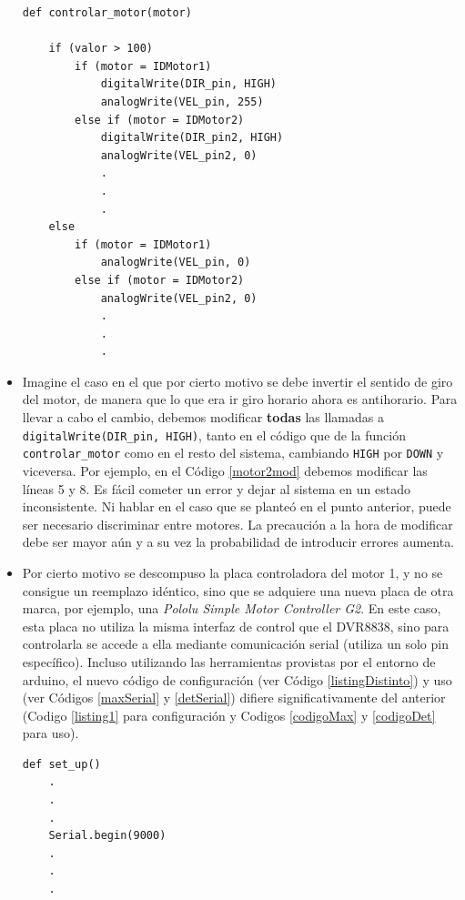 \begin{itemize}
\begin{lstlisting}[caption=Modificación de la función controlar\_motor para cambiar su comportamiento al utilizar el motor 2.,label={motor2mod}]
def controlar_motor(motor)

	if (valor > 100)
		if (motor = IDMotor1)
    		digitalWrite(DIR_pin, HIGH)
	    	analogWrite(VEL_pin, 255)
		else if (motor = IDMotor2)
	    	digitalWrite(DIR_pin2, HIGH)
	    	analogWrite(VEL_pin2, 0)
	    	.
	    	.
	    	.
	else
		if (motor = IDMotor1)
	    	analogWrite(VEL_pin, 0)
		else if (motor = IDMotor2)
	    	analogWrite(VEL_pin2, 0)
	    	.
	    	.
	    	.

\end{lstlisting}
	\item Imagine el caso en el que por cierto motivo se debe invertir el sentido de giro del motor, de manera que lo que era ir giro horario ahora es antihorario. Para llevar a cabo el cambio, debemos modificar \textbf{todas} las llamadas a \verb|digitalWrite(DIR_pin, HIGH)|, tanto en el código que de la función \verb|controlar_motor| como en el resto del sistema, cambiando \verb|HIGH| por \verb|DOWN| y viceversa. Por ejemplo, en el Código \ref{motor2mod} debemos modificar las líneas 5 y 8. Es fácil cometer un error y dejar al sistema en un estado inconsistente. Ni hablar en el caso que se planteó en el punto anterior, puede ser necesario discriminar entre motores. La precaución a la hora de modificar debe ser mayor aún y a su vez la probabilidad de introducir errores aumenta.
   
    \item Por cierto motivo se descompuso la placa controladora del motor 1, y no se consigue un reemplazo idéntico, sino que se adquiere una nueva placa de otra marca, por ejemplo, una \textit{Pololu Simple Motor Controller G2}. En este caso, esta placa no utiliza la misma interfaz de control que el \gls{DVR8838}, sino para controlarla se accede a ella mediante comunicación serial (utiliza un solo pin específico). Incluso utilizando las herramientas provistas por el entorno de \gls{arduino}, el nuevo código de configuración (ver Código \ref{listingDistinto}) y uso (ver Códigos \ref{maxSerial} y \ref{detSerial}) difiere significativamente del anterior (Codigo \ref{listing1} para configuración y Codigos \ref{codigoMax} y \ref{codigoDet} para uso).
\begin{lstlisting}[caption=Configuración de la placa de control del motor DC utiliza comunicación serie., label={listingDistinto}]
def set_up() 
    .
    .
    .
    Serial.begin(9000)
    .
    .
    .


\end{lstlisting}
\end{itemize}
